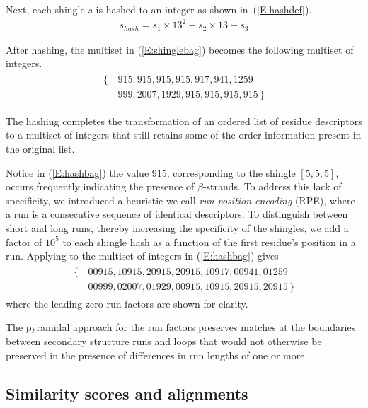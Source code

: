 \documentclass[10pt,letterpaper]{article}
\begin{document}
Next, each shingle $s$ is hashed to an integer as shown in~(\ref{E:hashdef}). 
\begin{gather}\label{E:hashdef}
    s_{hash} = s_1 \times 13^2 + s_2 \times 13 + s_3
\end{gather}

After hashing, the multiset in (\ref{E:shinglebag}) becomes the following multiset of integers.
\begin{align}\label{E:hashbag}
    \begin{split}
    \{\,&915, 915, 915, 915, 917, 941, 1259 \\
        &999, 2007, 1929, 915, 915, 915, 915 \,\}
    \end{split}
\end{align}

The hashing completes the transformation of an ordered list of residue descriptors to a multiset of integers that still retains some of the order information present in the original list. 

Notice in (\ref{E:hashbag}) the value 915, corresponding to the shingle $[ 5, 5, 5 ]$, occurs frequently indicating the presence of $\beta$-strands. 
To address this lack of specificity, we introduced a heuristic we call \emph{run position encoding} (RPE), where a run is a consecutive sequence of identical descriptors. 
To distinguish between short and long runs, thereby increasing the specificity of the shingles, we add a factor of $10^5$ to each shingle hash as a function of the first residue's position in a run. 
Applying to the multiset of integers in (\ref{E:hashbag}) gives
\begin{align}\label{E:rpebag}
    \begin{split}
    \{\,&00915, 10915, 20915, 20915, 10917, 00941, 01259 \\
        &00999, 02007, 01929, 00915, 10915, 20915, 20915 \,\}
    \end{split}
\end{align}
where the leading zero run factors are shown for clarity. 

The pyramidal approach for the run factors preserves matches at the boundaries between secondary structure runs and loops that would not otherwise be preserved in the presence of differences in run lengths of one or more. 

\subsection*{Similarity scores and alignments}
\end{document}
